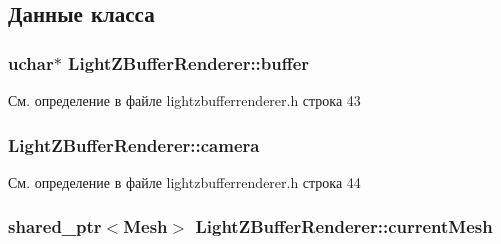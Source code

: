 \subsection{Данные класса}
\subsubsection[{\texorpdfstring{buffer}{buffer}}]{\setlength{\rightskip}{0pt plus 5cm}uchar$\ast$ Light\+Z\+Buffer\+Renderer\+::buffer\hspace{0.3cm}{\ttfamily [protected]}}\hypertarget{class_light_z_buffer_renderer_adb59e3ede69cc0d7ebf1c203bd01a8fd}{}\label{class_light_z_buffer_renderer_adb59e3ede69cc0d7ebf1c203bd01a8fd}


См. определение в файле lightzbufferrenderer.\+h строка 43

\subsubsection[{\texorpdfstring{camera}{camera}}]{ Light\+Z\+Buffer\+Renderer\+::camera\hspace{0.3cm}{\ttfamily [protected]}}\hypertarget{class_light_z_buffer_renderer_a0484f1880ff31e965399a77b8795903f}{}\label{class_light_z_buffer_renderer_a0484f1880ff31e965399a77b8795903f}


См. определение в файле lightzbufferrenderer.\+h строка 44

\subsubsection[{\texorpdfstring{current\+Mesh}{currentMesh}}]{\setlength{\rightskip}{0pt plus 5cm}shared\+\_\+ptr$<${\bf Mesh}$>$ Light\+Z\+Buffer\+Renderer\+::current\+Mesh\hspace{0.3cm}{\ttfamily [protected]}}\hypertarget{class_light_z_buffer_renderer_a7971a31fc4b6ce58e115fa0a3580f46c}{}\label{class_light_z_buffer_renderer_a7971a31fc4b6ce58e115fa0a3580f46c}



